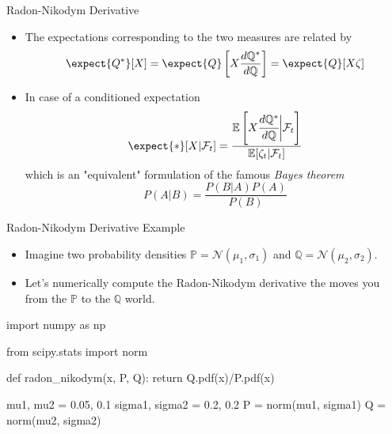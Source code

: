 \documentclass{beamer}
\begin{document}
\begin{frame}{Radon-Nikodym Derivative}
  \begin{itemize}
  \item The expectations corresponding to the two measures are related by
    \begin{equation*}
      \expect{Q^*}[X] = \expect{Q}\left[X\frac{d\mathbb{Q}^*}{d\mathbb{Q}}\right]= \expect{Q}[X\zeta]
    \end{equation*}
	\pause
  \item In case of a conditioned expectation
    \begin{equation}
      \expect{*}[X|\mathcal{F}_t] = \frac{\mathbb{E}\left[X\cfrac{d\mathbb{Q}^*}{d\mathbb{Q}}\bigg|\mathcal{F}_t\right]}{\mathbb{E}[\zeta_t|\mathcal{F}_t]}
      \label{eq:conditioned_expectation}
    \end{equation}
    which is an "equivalent" formulation of the famous \emph{Bayes theorem}
    \begin{equation*}
      P(A|B)=\frac{P(B|A)P(A)}{P(B)}
    \end{equation*}
  \end{itemize}
\end{frame}

\begin{frame}[fragile]{Radon-Nikodym Derivative Example}
  \begin{itemize}
      \item Imagine two probability densities $\mathbb{P} = \mathcal{N}(\mu_1, \sigma_1)$ and $\mathbb{Q} = \mathcal{N}(\mu_2, \sigma_2)$.
      \item Let's numerically compute the Radon-Nikodym derivative the moves you from the $\mathbb{P}$ to the $\mathbb{Q}$ world.
  \end{itemize}

\begin{codebox}
\begin{ipython}[linewidth=0.6\linewidth]
import numpy as np

from scipy.stats import norm

def radon_nikodym(x, P, Q):
    return Q.pdf(x)/P.pdf(x)

mu1, mu2 = 0.05, 0.1
sigma1, sigma2 = 0.2, 0.2
P = norm(mu1, sigma1)
Q = norm(mu2, sigma2)	
\end{ipython}
\end{codebox}
\end{frame}
\end{document}
